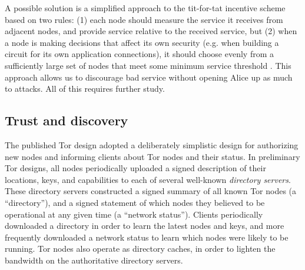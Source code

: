 \documentclass{llncs}
\begin{document}

A possible solution is a simplified approach to the tit-for-tat
incentive scheme based on two rules: (1) each node should measure the
service it receives from adjacent nodes, and provide service relative
to the received service, but (2) when a node is making decisions that
affect its own security (e.g. when building a circuit for its own
application connections), it should choose evenly from a sufficiently
large set of nodes that meet some minimum service threshold
\cite{casc-rep}.  This approach allows us to discourage bad service
without opening Alice up as much to attacks.  All of this requires
further study.




\subsection{Trust and discovery}
\label{subsec:trust-and-discovery}

The published Tor design adopted a deliberately simplistic design for
authorizing new nodes and informing clients about Tor nodes and their status.
In preliminary Tor designs, all nodes periodically uploaded a
signed description
of their locations, keys, and capabilities to each of several well-known {\it
  directory servers}.  These directory servers constructed a signed summary
of all known Tor nodes (a ``directory''), and a signed statement of which
nodes they
believed to be operational at any given time (a ``network status'').  Clients
periodically downloaded a directory in order to learn the latest nodes and
keys, and more frequently downloaded a network status to learn which nodes were
likely to be running.  Tor nodes also operate as directory caches, in order to
lighten the bandwidth on the authoritative directory servers.
\end{document}
